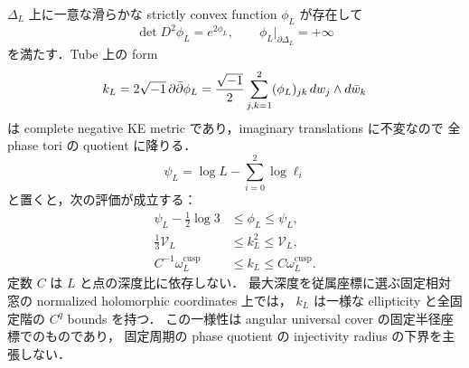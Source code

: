 \begin{lemma}
\label{coarse:lem:simplex-model}
$\Delta_L$ 上に一意な滑らかな strictly convex function $\phi_L$ が存在して
\begin{equation}\label{coarse:eq:simplex-real-MA}
 \det D^2\phi_L=e^{2\phi_L},\qquad
 \phi_L|_{\partial\Delta_L}=+\infty
\end{equation}
を満たす．Tube 上の form
\begin{equation}\label{coarse:eq:simplex-KE-form}
 k_L=2\sqrt{-1}\,\partial\bar\partial\phi_L
    =\frac{\sqrt{-1}}2\sum_{j,k=1}^2
       (\phi_L)_{jk}\,dw_j\wedge d\bar w_k
\end{equation}
は complete negative KE metric であり，imaginary translations に不変なので
全 phase tori の quotient に降りる．
\[
 \psi_L=\log L-\sum_{i=0}^2\log\ell_i
\]
と置くと，次の評価が成立する：
\begin{align}
 \psi_L-\tfrac12\log3&\le\phi_L\le\psi_L,
        \label{coarse:eq:simplex-potential-bounds}\\
 \tfrac13\mathcal V_L&\le k_L^2\le\mathcal V_L,
        \label{coarse:eq:simplex-density-bounds}\\
 C^{-1}\omega_L^{\mathrm{cusp}}&\le k_L
                       \le C\omega_L^{\mathrm{cusp}}.
        \label{coarse:eq:simplex-model-tensor}
\end{align}
定数 $C$ は $L$ と点の深度比に依存しない．
最大深度を従属座標に選ぶ固定相対窓の normalized holomorphic coordinates 上では，
$k_L$ は一様な ellipticity と全固定階の $C^q$ bounds を持つ．
この一様性は angular universal cover の固定半径座標でのものであり，
固定周期の phase quotient の injectivity radius の下界を主張しない．
\end{lemma}


